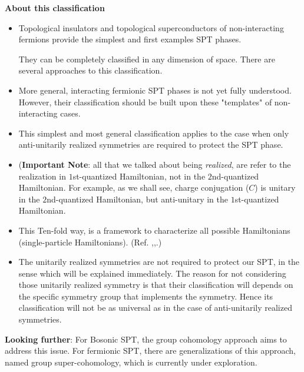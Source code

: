\documentclass{article}
\begin{document}
\textbf{About this classification}
\begin{itemize}
    \renewcommand{\labelitemi}{$\rightarrow$}
    \item Topological insulators and topological superconductors
        of non-interacting fermions provide the simplest and first
        examples SPT phases.

        They can be completely classified in any dimension of space.
        There are several approaches to this classification.

    \item More general, interacting fermionic SPT phases is not
        yet fully understood. However, their classification should be
        built upon these "templates" of non-interacting cases.
    \item This simplest and most general classification applies to
        the case when only anti-unitarily realized symmetries are
        required to protect the SPT phase. 
    \item (\textbf{Important Note}: all that we talked about being
        \textit{realized}, are refer to the realization in
        $1$st-quantized Hamiltonian, not in the $2$nd-quantized
        Hamiltonian. For example, as we shall see, charge conjugation
        ($C$) is unitary in the $2$nd-quantized Hamiltonian, but
        anti-unitary in the $1$st-quantized Hamiltonian.
    \item This Ten-fold way, is a framework to characterize all possible
        Hamiltonians (single-particle Hamiltonians). (Ref.
        \cite{Zirnbauer1996},\cite{Altland1997},\cite{Schnyder2009}.)
    \item The unitarily realized symmetries are not required to
        protect our SPT, in the sense which will be explained
        immediately. The reason for not considering those unitarily
        realized symmetry is that their classification will depends on
        the specific symmetry group that implements the symmetry.
        Hence its classification will not be as universal as in the
        case of anti-unitarily realized symmetries.

\end{itemize}

\textbf{Looking further}: For Bosonic SPT, the group cohomology
approach aims to address this issue. For fermionic SPT, there are
generalizations of this approach, named group super-cohomology, which
is currently under exploration.
\end{document}
